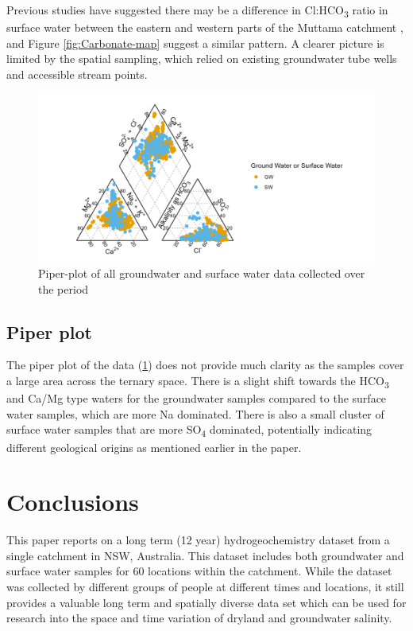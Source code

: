 \documentclass[, manuscript]{copernicus}
\begin{document}
Previous studies have suggested there may be a difference in
Cl:HCO\textsubscript{3} ratio in surface water between the eastern and
western parts of the Muttama catchment \citep{Conyers2008}, and Figure
\ref{fig:Carbonate-map} suggest a similar pattern. A clearer picture is
limited by the spatial sampling, which relied on existing groundwater
tube wells and accessible stream points.

\begin{figure}
\includegraphics[width=0.8\linewidth]{Figures/piper_plot} \caption{Piper-plot of all groundwater and surface water data collected over the period}\label{fig:piperplot}
\end{figure}

\subsection{Piper plot}

The piper plot of the data (\ref{fig:piperplot}) does not provide much
clarity as the samples cover a large area across the ternary space.
There is a slight shift towards the HCO\textsubscript{3} and Ca/Mg type
waters for the groundwater samples compared to the surface water
samples, which are more Na dominated. There is also a small cluster of
surface water samples that are more SO\textsubscript{4} dominated,
potentially indicating different geological origins as mentioned earlier
in the paper.

\section{Conclusions}

This paper reports on a long term (12 year) hydrogeochemistry dataset
from a single catchment in NSW, Australia. This dataset includes both
groundwater and surface water samples for 60 locations within the
catchment. While the dataset was collected by different groups of people
at different times and locations, it still provides a valuable long term
and spatially diverse data set which can be used for research into the
space and time variation of dryland and groundwater salinity.
\end{document}

